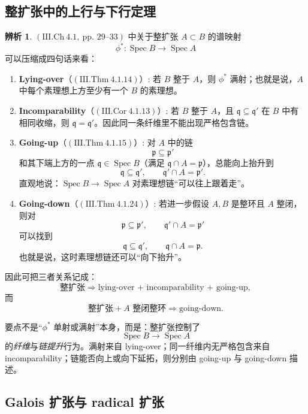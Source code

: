 \documentclass[a4paper]{ctexart}
\theoremstyle{definition}
\theoremstyle{analysis}
\newtheorem{remark}{辨析}[section]
\theoremstyle{plain}
\begin{document}
\subsection{整扩张中的上行与下行定理}\label{subsec:going-up-down}

\begin{remark}
\label{rem:going-up-down}
\((\mathrm{III.Ch}\ 4.1,\ \text{pp.\ 29--33})\) 中关于整扩张 \(A\subset B\) 的谱映射
\[
  \phi^*:\operatorname{Spec} B\to \operatorname{Spec} A
\]
可以压缩成四句话来看：
\begin{enumerate}
  \item \textbf{Lying-over}（\((\mathrm{III.Thm}\ 4.1.14)\)）: 若 \(B\) 整于 \(A\)，则 \(\phi^*\) 满射；也就是说，\(A\) 中每个素理想上方至少有一个 \(B\) 的素理想。
  \item \textbf{Incomparability}（\((\mathrm{III.Cor}\ 4.1.13)\)）: 若 \(B\) 整于 \(A\)，且 \(\mathfrak q\subseteq \mathfrak q'\) 在 \(B\) 中有相同收缩，则 \(\mathfrak q=\mathfrak q'\)。因此同一条纤维里不能出现严格包含链。
  \item \textbf{Going-up}（\((\mathrm{III.Thm}\ 4.1.15)\)）: 对 \(A\) 中的链
  \[
    \mathfrak p\subseteq \mathfrak p'
  \]
  和其下端上方的一点 \(\mathfrak q\in \operatorname{Spec} B\)（满足 \(\mathfrak q\cap A=\mathfrak p\)），总能向上抬升到
  \[
    \mathfrak q\subseteq \mathfrak q',\qquad \mathfrak q'\cap A=\mathfrak p'.
  \]
  直观地说：\(\operatorname{Spec} B\to\operatorname{Spec} A\) 对素理想链“可以往上跟着走”。
  \item \textbf{Going-down}（\((\mathrm{III.Thm}\ 4.1.24)\)）: 若进一步假设 \(A,B\) 是整环且 \(A\) 整闭，则对
  \[
    \mathfrak p\subseteq \mathfrak p',\qquad \mathfrak q'\cap A=\mathfrak p'
  \]
  可以找到
  \[
    \mathfrak q\subseteq \mathfrak q',\qquad \mathfrak q\cap A=\mathfrak p.
  \]
  也就是说，这时素理想链还可以“向下抬升”。
\end{enumerate}

因此可把三者关系记成：
\[
  \text{整扩张}
  \Longrightarrow
  \text{lying-over + incomparability + going-up},
\]
而
\[
  \text{整扩张}+\text{\(A\) 整闭整环}
  \Longrightarrow
  \text{going-down}.
\]

要点不是“\(\phi^*\) 单射或满射”本身，而是：整扩张控制了
\[
  \operatorname{Spec} B\to\operatorname{Spec} A
\]
的\emph{纤维}与\emph{链提升}行为。满射来自 lying-over；同一纤维内无严格包含来自 incomparability；链能否向上或向下延拓，则分别由 going-up 与 going-down 描述。
\end{remark}

\subsection{Galois 扩张与 radical 扩张}\label{subsec:galois-radical}
\end{document}
